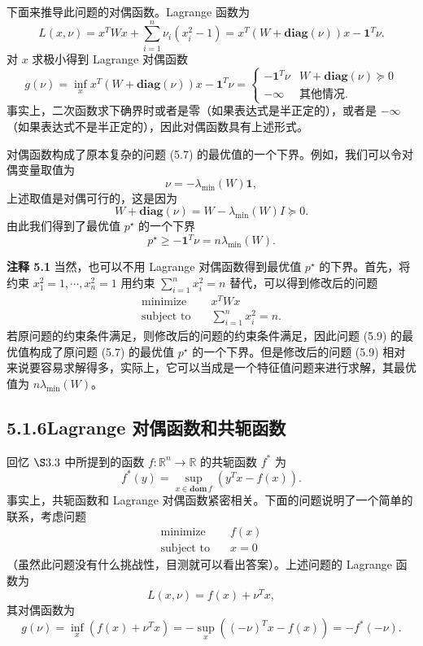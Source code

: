 \documentclass[UTF8, 12pt, fontset=fandol, oneside]{ctexart}
\begin{document}
下面来推导此问题的对偶函数。Lagrange 函数为
\[
L(x,\nu)=x^TWx+\sum_{i=1}^n \nu_i(x_i^2-1)
=x^T(W+\mathbf{diag}(\nu))x-\mathbf{1}^T\nu.
\]
对 $x$ 求极小得到 Lagrange 对偶函数
\[
g(\nu)=\inf_x x^T(W+\mathbf{diag}(\nu))x-\mathbf{1}^T\nu
=
\begin{cases}
-\mathbf{1}^T\nu & W+\mathbf{diag}(\nu)\succeq 0\\
-\infty & \text{其他情况}.
\end{cases}
\]
事实上，二次函数求下确界时或者是零（如果表达式是半正定的），或者是 $-\infty$（如果表达式不是半正定的），因此对偶函数具有上述形式。

对偶函数构成了原本复杂的问题 (5.7) 的最优值的一个下界。例如，我们可以令对偶变量取值为
\[
\nu=-\lambda_{\min}(W)\mathbf{1},
\]
上述取值是对偶可行的，这是因为
\[
W+\mathbf{diag}(\nu)=W-\lambda_{\min}(W)I\succeq 0.
\]
由此我们得到了最优值 $p^\star$ 的一个下界
\begin{equation}
p^\star\geq -\mathbf{1}^T\nu=n\lambda_{\min}(W).
\tag{5.8}
\end{equation}

\noindent\textbf{注释 5.1}\quad
当然，也可以不用 Lagrange 对偶函数得到最优值 $p^\star$ 的下界。首先，将约束 $x_1^2=1,\cdots,x_n^2=1$ 用约束 $\sum_{i=1}^n x_i^2=n$ 替代，可以得到修改后的问题
\begin{equation}
\begin{aligned}
\text{minimize}\quad & x^T W x\\
\text{subject to}\quad & \sum_{i=1}^n x_i^2=n.
\end{aligned}
\tag{5.9}
\end{equation}
若原问题的约束条件满足，则修改后的问题的约束条件满足，因此问题 (5.9) 的最优值构成了原问题 (5.7) 的最优值 $p^\star$ 的一个下界。但是修改后的问题 (5.9) 相对来说要容易求解得多，实际上，它可以当成是一个特征值问题来进行求解，其最优值为 $n\lambda_{\min}(W)$。

\subsection*{5.1.6\quad Lagrange 对偶函数和共轭函数}

回忆 $\S 3.3$ 中所提到的函数 $f:\mathbb{R}^n\to\mathbb{R}$ 的共轭函数 $f^\ast$ 为
\[
f^\ast(y)=\sup_{x\in\mathbf{dom}\,f}(y^Tx-f(x)).
\]
事实上，共轭函数和 Lagrange 对偶函数紧密相关。下面的问题说明了一个简单的联系，考虑问题
\[
\begin{aligned}
\text{minimize}\quad & f(x)\\
\text{subject to}\quad & x=0
\end{aligned}
\]
（虽然此问题没有什么挑战性，目测就可以看出答案）。上述问题的 Lagrange 函数为
\[
L(x,\nu)=f(x)+\nu^Tx,
\]
其对偶函数为
\[
g(\nu)=\inf_x(f(x)+\nu^Tx)
=-\sup_x((- \nu)^Tx-f(x))
=-f^\ast(-\nu).
\]
\end{document}
